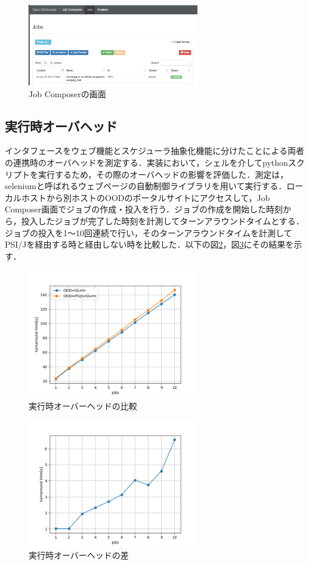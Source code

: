 \documentclass[a4paper,oneside,twocolumn,notitlepage,dvipdfmx]{jsarticle}
\begin{document}
\begin{figure}[h]
  \centering
  \includegraphics[width=75mm]{./fig/jobcomposer.png}
  \caption{Job Composerの画面}
  \label{fig4}
\end{figure}

\subsection{実行時オーバヘッド}
インタフェースをウェブ機能とスケジューラ抽象化機能に分けたことによる両者の連携時のオーバヘッドを測定する．実装において，シェルを介してpythonスクリプトを実行するため，その際のオーバヘッドの影響を評価した．測定は，seleniumと呼ばれるウェブページの自動制御ライブラリを用いて実行する．ローカルホストから別ホストのOODのポータルサイトにアクセスして，Job Composer画面でジョブの作成・投入を行う．ジョブの作成を開始した時刻から，投入したジョブが完了した時刻を計測してターンアラウンドタイムとする．ジョブの投入を1～10回連続で行い，そのターンアラウンドタイムを計測してPSI/Jを経由する時と経由しない時を比較した．以下の図\ref{fig2}，図\ref{fig3}にその結果を示す．\par

\begin{figure}[h]
  \centering
  \includegraphics[width=75mm]{./fig/ave_1-20.png}
  \caption{実行時オーバーヘッドの比較}
  \label{fig2}
\end{figure}

\begin{figure}[h]
  \centering
  \includegraphics[width=75mm]{./fig/ave_diff_1-20.png}
  \caption{実行時オーバーヘッドの差}
  \label{fig3}
\end{figure}
\end{document}
